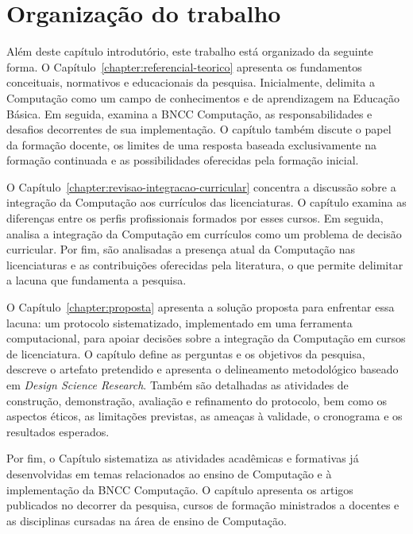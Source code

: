 \section{Organização do trabalho}
\label{sec:organizacao-trabalho}

Além deste capítulo introdutório, este trabalho está organizado da seguinte forma. O Capítulo~\ref{chapter:referencial-teorico} apresenta os fundamentos conceituais, normativos e educacionais da pesquisa. Inicialmente, delimita a Computação como um campo de conhecimentos e de aprendizagem na Educação Básica. Em seguida, examina a BNCC Computação, as responsabilidades e desafios decorrentes de sua implementação. O capítulo também discute o papel da formação docente, os limites de uma resposta baseada exclusivamente na formação continuada e as possibilidades oferecidas pela formação inicial.

O Capítulo~\ref{chapter:revisao-integracao-curricular} concentra a discussão sobre a integração da Computação aos currículos das licenciaturas. O capítulo examina as diferenças entre os perfis profissionais formados por esses cursos. Em seguida, analisa a integração da Computação em currículos como um problema de decisão curricular. Por fim, são analisadas a presença atual da Computação nas licenciaturas e as contribuições oferecidas pela literatura, o que permite delimitar a lacuna que fundamenta a pesquisa.

O Capítulo~\ref{chapter:proposta} apresenta a solução proposta para enfrentar essa lacuna: um protocolo sistematizado, implementado em uma ferramenta computacional, para apoiar decisões sobre a integração da Computação em cursos de licenciatura. O capítulo define as perguntas e os objetivos da pesquisa, descreve o artefato pretendido e apresenta o delineamento metodológico baseado em \textit{Design Science Research}. Também são detalhadas as atividades de construção, demonstração, avaliação e refinamento do protocolo, bem como os aspectos éticos, as limitações previstas, as ameaças à validade, o cronograma e os resultados esperados.

Por fim, o Capítulo sistematiza as atividades acadêmicas e formativas já desenvolvidas em temas relacionados ao ensino de Computação e à implementação da BNCC Computação. O capítulo apresenta os artigos publicados no decorrer da pesquisa, cursos de formação ministrados a docentes e as disciplinas cursadas na área de ensino de Computação.